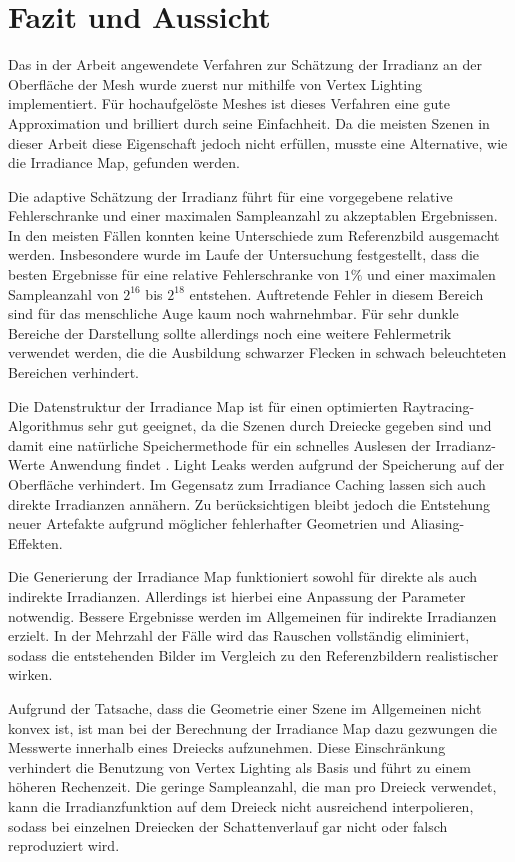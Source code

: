 \section{Fazit und Aussicht} %
\label{sec:fazit_und_aussicht}

	Das in der Arbeit angewendete Verfahren zur Schätzung der Irradianz an der Oberfläche der Mesh wurde zuerst nur mithilfe von Vertex Lighting implementiert.
	Für hochaufgelöste Meshes ist dieses Verfahren eine gute Approximation und brilliert durch seine Einfachheit.
	Da die meisten Szenen in dieser Arbeit diese Eigenschaft jedoch nicht erfüllen, musste eine Alternative, wie die Irradiance Map, gefunden werden.

	Die adaptive Schätzung der Irradianz führt für eine vorgegebene relative Fehlerschranke und einer maximalen Sampleanzahl zu akzeptablen Ergebnissen.
	In den meisten Fällen konnten keine Unterschiede zum Referenzbild ausgemacht werden.
	Insbesondere wurde im Laufe der Untersuchung festgestellt, dass die besten Ergebnisse für eine relative Fehlerschranke von $1\unit{\%}$ und einer maximalen Sampleanzahl von $2^{16}$ bis $2^{18}$ entstehen.
	Auftretende Fehler in diesem Bereich sind für das menschliche Auge kaum noch wahrnehmbar.
	Für sehr dunkle Bereiche der Darstellung sollte allerdings noch eine weitere Fehlermetrik verwendet werden, die die Ausbildung schwarzer Flecken in schwach beleuchteten Bereichen verhindert.

	Die Datenstruktur der Irradiance Map ist für einen optimierten Raytracing-Algorithmus sehr gut geeignet, da die Szenen durch Dreiecke gegeben sind und damit eine natürliche Speichermethode für ein schnelles Auslesen der Irradianz-Werte Anwendung findet \cite{ray-triangle-intersection}.
	Light Leaks werden aufgrund der Speicherung auf der Oberfläche verhindert.
	Im Gegensatz zum Irradiance Caching lassen sich auch direkte Irradianzen annähern.
	Zu berücksichtigen bleibt jedoch die Entstehung neuer Artefakte aufgrund möglicher fehlerhafter Geometrien und Aliasing-Effekten.

	Die Generierung der Irradiance Map funktioniert sowohl für direkte als auch indirekte Irradianzen.
	Allerdings ist hierbei eine Anpassung der Parameter notwendig.
	Bessere Ergebnisse werden im Allgemeinen für indirekte Irradianzen erzielt.
	In der Mehrzahl der Fälle wird das Rauschen vollständig eliminiert, sodass die entstehenden Bilder im Vergleich zu den Referenzbildern realistischer wirken.

	Aufgrund der Tatsache, dass die Geometrie einer Szene im Allgemeinen nicht konvex ist, ist man bei der Berechnung der Irradiance Map dazu gezwungen die Messwerte innerhalb eines Dreiecks aufzunehmen.
	Diese Einschränkung verhindert die Benutzung von Vertex Lighting als Basis und führt zu einem höheren Rechenzeit.
	Die geringe Sampleanzahl, die man pro Dreieck verwendet, kann die Irradianzfunktion auf dem Dreieck nicht ausreichend interpolieren, sodass bei einzelnen Dreiecken der Schattenverlauf gar nicht oder falsch reproduziert wird.

